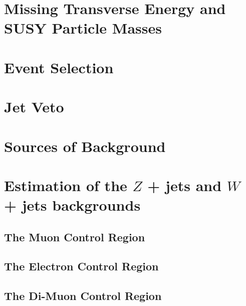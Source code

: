 \documentclass[10pt,twoside,cucitura,classica,openany]{toptesi}
\begin{document}


\section{Missing Transverse Energy and SUSY Particle Masses}
\label{sec:motivation}



\section{Event Selection}
\label{sec:event-selection}



\section{Jet Veto }
\label{sec:jet-veto}



\section{Sources of Background}
\label{sec:sources-background}



\section{Estimation of the $Z$ + jets and $W$ + jets backgrounds}
\label{sec:estimation-z-+}



\subsection{The Muon Control Region}
\label{sec:muon-control-region}



\subsection{The Electron Control Region}
\label{sec:electr-contr-regi}



\subsection{The Di-Muon Control Region}
\label{sec:di-muon-control}
\end{document}
